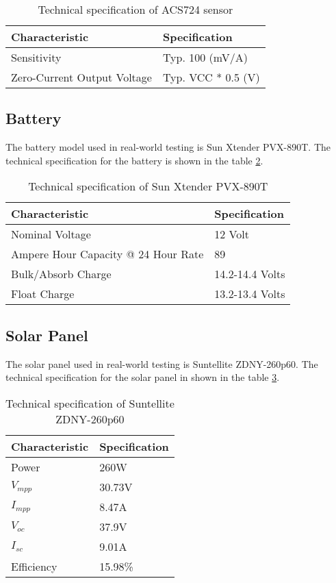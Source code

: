 \documentclass[../thesis.tex]{subfiles}
\begin{document}
\begin{table}[h!]
\begin{center}
\caption{Technical specification of ACS724 sensor}
\label{tab:acs724}
\begin{tabular}{l|l}
\toprule
\textbf{Characteristic} & \textbf{Specification}\\
\midrule
Sensitivity & Typ. 100 (mV/A)\\
Zero-Current Output Voltage & Typ. VCC * 0.5 (V)\\
\bottomrule
\end{tabular}
\end{center}
\end{table}

\newpage
\subsection{Battery}

The battery model used in real-world testing is Sun Xtender PVX-890T. The technical specification for the battery is shown in the table \ref{tab:pvx890t}.

\begin{table}[h!]
\begin{center}
\caption{Technical specification of Sun Xtender PVX-890T}
\label{tab:pvx890t}
\begin{tabular}{l|l}
\toprule
\textbf{Characteristic} & \textbf{Specification}\\
\midrule
Nominal Voltage & 12 Volt\\
Ampere Hour Capacity @ 24 Hour Rate & 89\\
Bulk/Absorb Charge & 14.2-14.4 Volts\\
Float Charge & 13.2-13.4 Volts\\
\bottomrule
\end{tabular}
\end{center}
\end{table}

\subsection{Solar Panel}

The solar panel used in real-world testing is Suntellite ZDNY-260p60. The technical specification for the solar panel in shown in the table \ref{tab:solarpanel}.

\begin{table}[h!]
\begin{center}
\caption{Technical specification of Suntellite ZDNY-260p60}
\label{tab:solarpanel}
\begin{tabular}{l|l}
\toprule
\textbf{Characteristic} & \textbf{Specification}\\
\midrule
Power & 260W\\
$V_{mpp}$ & 30.73V\\
$I_{mpp}$ & 8.47A\\
$V_{oc}$ & 37.9V\\
$I_{sc}$& 9.01A\\
Efficiency& 15.98\%\\
\bottomrule
\end{tabular}
\end{center}
\end{table}
\end{document}
